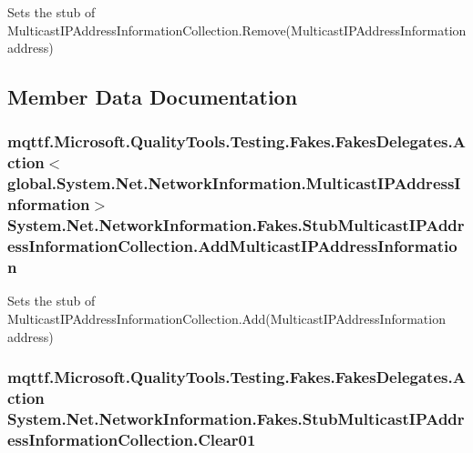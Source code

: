 Sets the stub of Multicast\-I\-P\-Address\-Information\-Collection.\-Remove(\-Multicast\-I\-P\-Address\-Information address)



\subsection{Member Data Documentation}
\hypertarget{class_system_1_1_net_1_1_network_information_1_1_fakes_1_1_stub_multicast_i_p_address_information_collection_a63b557fc15598076c83d2812e9af5eed}{
\subsubsection[{Add\-Multicast\-I\-P\-Address\-Information}]{\setlength{\rightskip}{0pt plus 5cm}mqttf.\-Microsoft.\-Quality\-Tools.\-Testing.\-Fakes.\-Fakes\-Delegates.\-Action$<$global.\-System.\-Net.\-Network\-Information.\-Multicast\-I\-P\-Address\-Information$>$ System.\-Net.\-Network\-Information.\-Fakes.\-Stub\-Multicast\-I\-P\-Address\-Information\-Collection.\-Add\-Multicast\-I\-P\-Address\-Information}}\label{class_system_1_1_net_1_1_network_information_1_1_fakes_1_1_stub_multicast_i_p_address_information_collection_a63b557fc15598076c83d2812e9af5eed}


Sets the stub of Multicast\-I\-P\-Address\-Information\-Collection.\-Add(\-Multicast\-I\-P\-Address\-Information address)

\hypertarget{class_system_1_1_net_1_1_network_information_1_1_fakes_1_1_stub_multicast_i_p_address_information_collection_ae9d4bfd16c4dd6411ca37b5b451a81b8}{
\subsubsection[{Clear01}]{\setlength{\rightskip}{0pt plus 5cm}mqttf.\-Microsoft.\-Quality\-Tools.\-Testing.\-Fakes.\-Fakes\-Delegates.\-Action System.\-Net.\-Network\-Information.\-Fakes.\-Stub\-Multicast\-I\-P\-Address\-Information\-Collection.\-Clear01}}\label{class_system_1_1_net_1_1_network_information_1_1_fakes_1_1_stub_multicast_i_p_address_information_collection_ae9d4bfd16c4dd6411ca37b5b451a81b8}


